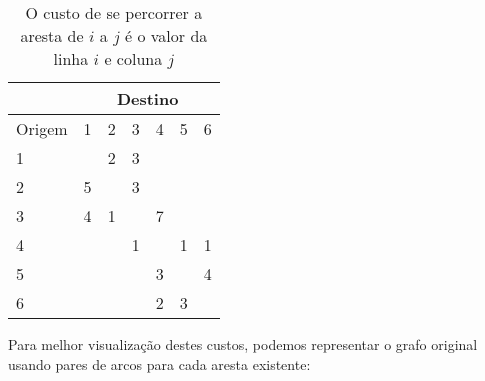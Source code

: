         \begin{table}[h!]
            \centering
            \begin{tabular}{|p{1.5cm}||p{1cm}|p{1cm}|p{1cm}|p{1cm}|p{1cm}|p{1cm}|}
                \hline
                    & \multicolumn{6}{|c|}{Destino} \\
                \hline
                   Origem & 1 & 2 & 3 & 4 & 5 & 6\\
                \hline
                \hline
                1 &  & 2 & 3 &  & & \\
                \hline
                2 & 5 &  & 3 & & & \\
                \hline
                3 & 4 & 1 & & 7 & & \\
                \hline
                4 &  & & 1 & & 1 & 1\\
                \hline
                5 &  & & & 3 & & 4\\
                \hline
                6 &  &  & & 2 & 3 &\\
                \hline
            \end{tabular}
            \caption{O custo de se percorrer a aresta de $i$ a $j$ é o valor da linha $i$ e coluna $j$}
            \label{tabela:exemplopccv}
    \end{table}
        
        Para melhor visualização destes custos, podemos representar o grafo original usando pares de arcos para cada aresta existente:

